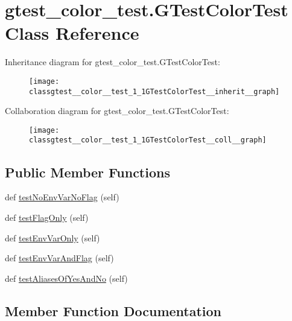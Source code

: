 \hypertarget{classgtest__color__test_1_1GTestColorTest}{}\section{gtest\+\_\+color\+\_\+test.\+G\+Test\+Color\+Test Class Reference}
\label{classgtest__color__test_1_1GTestColorTest}


Inheritance diagram for gtest\+\_\+color\+\_\+test.\+G\+Test\+Color\+Test\+:\nopagebreak
\begin{figure}[H]
\begin{center}
\leavevmode
\texttt{[image: classgtest\_\_color\_\_test\_1\_1GTestColorTest\_\_inherit\_\_graph]}
\end{center}
\end{figure}


Collaboration diagram for gtest\+\_\+color\+\_\+test.\+G\+Test\+Color\+Test\+:\nopagebreak
\begin{figure}[H]
\begin{center}
\leavevmode
\texttt{[image: classgtest\_\_color\_\_test\_1\_1GTestColorTest\_\_coll\_\_graph]}
\end{center}
\end{figure}
\subsection*{Public Member Functions}
\begin{DoxyCompactItemize}
\item 
def \hyperlink{classgtest__color__test_1_1GTestColorTest_a22bf83ab416dc3ccd3c1b771ff74022c}{test\+No\+Env\+Var\+No\+Flag} (self)
\item 
def \hyperlink{classgtest__color__test_1_1GTestColorTest_abc4c056b8e703e83516f9e5aea8dd25d}{test\+Flag\+Only} (self)
\item 
def \hyperlink{classgtest__color__test_1_1GTestColorTest_aedb7bbaa0d6acff3628d91a471f4ceb5}{test\+Env\+Var\+Only} (self)
\item 
def \hyperlink{classgtest__color__test_1_1GTestColorTest_ae88e8ec526135ed1448e83fc4ec7cd15}{test\+Env\+Var\+And\+Flag} (self)
\item 
def \hyperlink{classgtest__color__test_1_1GTestColorTest_aaf2110e359494dc711e87d29d351dc47}{test\+Aliases\+Of\+Yes\+And\+No} (self)
\end{DoxyCompactItemize}


\subsection{Member Function Documentation}
